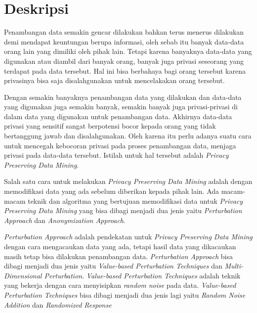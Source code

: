 \documentclass[a4paper,twoside]{article}
\begin{document}
\title{\@judultopik}
\author{\nama \textendash \@npm} 

\newcommand{\nama}{Chris Eldon}
\newcommand{\@npm}{2016730073}
\newcommand{\@judultopik}{Privacy Preserving Data Mining dengan Metode Randomization} %
\newcommand{\jumpemb}{1} %
\newcommand{\tanggal}{23/08/2019}


\maketitle


\section{Deskripsi}
Penambangan data semakin gencar dilakukan bahkan terus menerus dilakukan demi mendapat keuntungan berupa informasi, oleh sebab itu banyak data-data orang lain yang dimiliki oleh pihak lain. Tetapi karena banyaknya data-data yang digunakan atau diambil dari banyak orang, banyak juga privasi seseorang yang terdapat pada data tersebut. Hal ini bisa berbahaya bagi orang tersebut karena privasinya bisa saja disalahgunakan untuk mencelakakan orang tersebut.

Dengan semakin banyaknya penambangan data yang dilakukan dan data-data yang digunakan juga semakin banyak, semakin banyak juga privasi-privasi di dalam data yang digunakan untuk penambangan data. Akhirnya data-data privasi yang sensitif sangat berpotensi bocor kepada orang yang tidak bertanggung jawab dan disalahgunakan. Oleh karena itu perlu adanya suatu cara untuk mencegah kebocoran privasi pada proses penambangan data, menjaga privasi pada data-data tersebut. Istilah untuk hal tersebut adalah \textit{Privacy Preserving Data Mining}.

Salah satu cara untuk melakukan \textit{Privacy Preserving Data Mining} adalah dengan memodifikasi data yang ada sebelum diberikan kepada pihak lain. Ada macam-macam teknik dan algoritma yang bertujuan memodifikasi data untuk \textit{Privacy Preserving Data Mining} yang bisa dibagi menjadi dua jenis yaitu \textit{Perturbation Approach} dan \textit{Anonymization Approach}. 

\textit{Perturbation Approach} adalah pendekatan untuk \textit{Privacy Preserving Data Mining} dengan cara mengacaukan data yang ada, tetapi hasil data yang dikacaukan masih tetap bisa dilakukan penambangan data. \textit{Perturbation Approach} bisa dibagi menjadi dua jenis yaitu \textit{Value-based Perturbation Techniques} dan \textit{Multi-Dimensional Perturbation}. \textit{Value-based Perturbation Techniques} adalah teknik yang bekerja dengan cara menyisipkan \textit{ random noise} pada data. \textit{Value-based Perturbation Techniques} bisa dibagi menjadi dua jenis lagi yaitu \textit{Random Noise Addition} dan \textit{Randomized Response}
\end{document}
